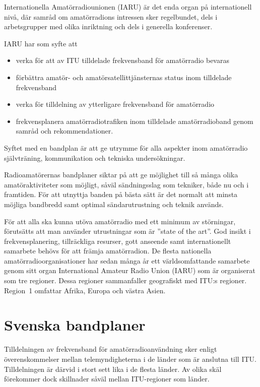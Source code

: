 Internationella Amatörradiounionen (IARU) är det enda organ på internationell
nivå, där samråd om amatörradions intressen sker regelbundet, dels i
arbetsgrupper med olika inriktning och dels i generella konferenser.

IARU har som syfte att
\begin{itemize}
  \item verka för att av ITU tilldelade frekvensband för amatörradio bevaras
  \item förbättra amatör- och amatörsatellittjänsternas status inom tilldelade
  frekvensband
  \item verka för tilldelning av ytterligare frekvensband för amatörradio
  \item frekvensplanera amatörradiotrafiken inom tilldelade amatörradioband genom
  samråd och rekommendationer.
\end{itemize}

Syftet med en bandplan är att ge utrymme för alla aspekter inom amatörradio
självträning, kommunikation och tekniska undersökningar.

Radioamatörernas bandplaner siktar på att ge möjlighet till så många olika
amatöraktiviteter som möjligt, såväl sändningsslag som tekniker, både nu och i
framtiden. För att utnyttja banden på bästa sätt är det normalt att minsta
möjliga bandbredd samt optimal sändarutrustning och teknik används.

För att alla ska kunna utöva amatörradio med ett minimum av störningar,
förutsätts att man använder utrustningar som är ''state of the art''.  God
insikt i frekvensplanering, tillräckliga resurser, gott anseende samt
internationellt samarbete behövs för att främja amatörradion. De flesta
nationella amatörradioorganisationer har sedan många år ett världsomfattande
samarbete genom sitt organ International Amateur Radio Union (IARU) som är
organiserat som tre regioner. Dessa regioner sammanfaller geografiskt med ITU:s
regioner. Region~1 omfattar Afrika, Europa och västra Asien.

\section{Svenska bandplaner}

Tilldelningen av frekvensband för amatörradioanvändning sker enligt
överenskommelser mellan telemyndigheterna i de länder som är anslutna till
ITU.
Tilldelningen är därvid i stort sett lika i de flesta länder.
Av olika skäl förekommer dock skillnader såväl mellan ITU-regioner som länder.

